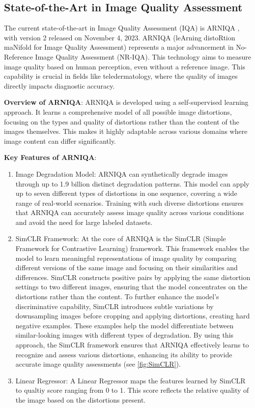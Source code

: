 \subsection{State-of-the-Art in Image Quality Assessment}
\label{sub:SOTA_IQA}
The current state-of-the-art in Image Quality Assessment (IQA) is ARNIQA \autocite{ARNIQA} , with version 2 released on November 4, 2023. ARNIQA (leArning distoRtion maNifold for Image Quality Assessment) represents a major advancement in No-Reference Image Quality Assessment (NR-IQA). This technology aims to measure image quality based on human perception, even without a reference image. This capability is crucial in fields like teledermatology, where the quality of images directly impacts diagnostic accuracy. \par
\vspace{\baselineskip}
\noindent
\textbf{Overview of ARNIQA}: ARNIQA is developed using a self-supervised learning approach. It learns a comprehensive model of all possible image distortions, focusing on the types and quality of distortions rather than the content of the images themselves. This makes it highly adaptable across various domains where image content can differ significantly. \par
\vspace{\baselineskip}
\noindent
\textbf{Key Features of ARNIQA}:
\begin{enumerate}
    \item Image Degradation Model: ARNIQA can synthetically degrade images through up to 1.9 billion distinct degradation patterns. This model can apply up to seven different types of distortions in one sequence, covering a wide range of real-world scenarios. Training with such diverse distortions ensures that ARNIQA can accurately assess image quality across various conditions and avoid the need for large labeled datasets.
    \item SimCLR Framework: At the core of ARNIQA is the SimCLR (Simple Framework for Contrastive Learning) framework. This framework enables the model to learn meaningful representations of image quality by comparing different versions of the same image and focusing on their similarities and differences. SimCLR constructs positive pairs by applying the same distortion settings to two different images, ensuring that the model concentrates on the distortions rather than the content. To further enhance the model’s discriminative capability, SimCLR introduces subtle variations by downsampling images before cropping and applying distortions, creating hard negative examples. These examples help the model differentiate between similar-looking images with different types of degradation. By using this approach, the SimCLR framework ensures that ARNIQA effectively learns to recognize and assess various distortions, enhancing its ability to provide accurate image quality assessments (see \autoref{fig:SimCLR}).
    \item Linear Regressor: A Linear Regressor maps the features learned by SimCLR to qualtiy score ranging from 0 to 1. This score reflects the relative quality of the image based on the distortions present.
\end{enumerate}
